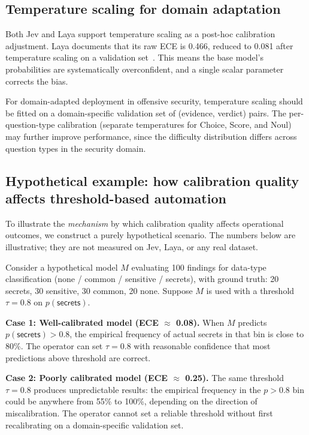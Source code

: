 \documentclass[conference]{IEEEtran}
\begin{document}
\subsection{Temperature scaling for domain adaptation}

Both Jev and Laya support temperature scaling as a post-hoc calibration adjustment. Laya documents that its raw ECE is 0.466, reduced to 0.081 after temperature scaling on a validation set~\cite{laya2026}. This means the base model's probabilities are systematically overconfident, and a single scalar parameter corrects the bias.

For domain-adapted deployment in offensive security, temperature scaling should be fitted on a domain-specific validation set of (evidence, verdict) pairs. The per-question-type calibration (separate temperatures for Choice, Score, and Noul) may further improve performance, since the difficulty distribution differs across question types in the security domain.

\subsection{Hypothetical example: how calibration quality affects threshold-based automation}

To illustrate the \emph{mechanism} by which calibration quality affects operational outcomes, we construct a purely hypothetical scenario. The numbers below are illustrative; they are not measured on Jev, Laya, or any real dataset.

Consider a hypothetical model $M$ evaluating 100 findings for data-type classification (none / common / sensitive / secrets), with ground truth: 20 secrets, 30 sensitive, 30 common, 20 none. Suppose $M$ is used with a threshold $\tau = 0.8$ on $p(\textsf{secrets})$.

\textbf{Case 1: Well-calibrated model (ECE $\approx$ 0.08).} When $M$ predicts $p(\textsf{secrets}) > 0.8$, the empirical frequency of actual secrets in that bin is close to 80\%. The operator can set $\tau = 0.8$ with reasonable confidence that most predictions above threshold are correct.

\textbf{Case 2: Poorly calibrated model (ECE $\approx$ 0.25).} The same threshold $\tau = 0.8$ produces unpredictable results: the empirical frequency in the $p > 0.8$ bin could be anywhere from 55\% to 100\%, depending on the direction of miscalibration. The operator cannot set a reliable threshold without first recalibrating on a domain-specific validation set.
\end{document}
